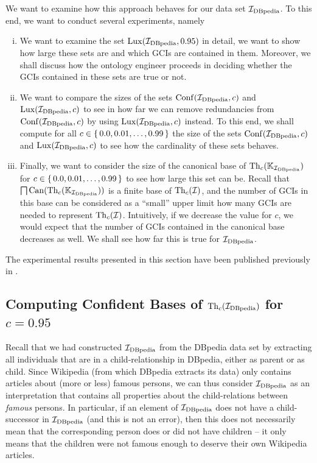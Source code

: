 We want to examine how this approach behaves for our data set ${\mathcal{I}_{\text{DBpedia}}}$.  To this end,
we want to conduct several experiments, namely
\begin{enumerate}[i. ]
\item We want to examine the set $\operatorname{Lux}({\mathcal{I}_{\text{DBpedia}}}, 0.95)$ in detail, \ie we want to show
  how large these sets are and which GCIs are contained in them.  Moreover, we shall
  discuss how the ontology engineer proceeds in deciding whether the GCIs contained in
  these sets are true or not.
\item We want to compare the sizes of the sets $\operatorname{Conf}({\mathcal{I}_{\text{DBpedia}}}, c)$ and $\operatorname{Lux}({\mathcal{I}_{\text{DBpedia}}},
  c)$ to see in how far we can remove redundancies from $\operatorname{Conf}({\mathcal{I}_{\text{DBpedia}}}, c)$ by using
  $\operatorname{Lux}({\mathcal{I}_{\text{DBpedia}}}, c)$ instead.  To this end, we shall compute for all $c \in {\ensuremath{\{\, 0.0,
    0.01, \dots, 0.99\,\}}}$ the size of the sets $\operatorname{Conf}({\mathcal{I}_{\text{DBpedia}}}, c)$ and $\operatorname{Lux}({\mathcal{I}_{\text{DBpedia}}},
  c)$ to see how the cardinality of these sets behaves.
\item Finally, we want to consider the size of the canonical base of $\operatorname{Th}_c({\mathbb{K}}_{\mathcal{I}_{\text{DBpedia}}})$ for $c \in {\ensuremath{\{\, 0.0, 0.01, \dots, 0.99 \,\}}}$ to see how large this set can
  be.  Recall that $\bigsqcap \operatorname{Can}(\operatorname{Th}_c({\mathbb{K}}_{\mathcal{I}_{\text{DBpedia}}}))$ is a finite base of
  $\operatorname{Th}_c(\mathcal{I})$, and the number of GCIs in this base can be considered as a
  ``small'' upper limit how many GCIs are needed to represent $\operatorname{Th}_c(\mathcal{I})$.
  Intuitively, if we decrease the value for $c$, we would expect that the number of GCIs
  contained in the canonical base decreases as well.  We shall see how far this is true
  for ${\mathcal{I}_{\text{DBpedia}}}$.
\end{enumerate}

The experimental results presented in this section have been published previously in
\cite{Borchmann-LTCS-12-06}.

\subsection{Computing Confident Bases of $\operatorname{Th}_c({\mathcal{I}_{\text{DBpedia}}})$ for $c = 0.95$}
\label{sec:comp-conf-bases}

Recall that we had constructed ${\mathcal{I}_{\text{DBpedia}}}$ from the DBpedia data set by extracting all
individuals that are in a \textsf{child}-relationship in DBpedia, either as parent or as
child.  Since Wikipedia (from which DBpedia extracts its data) only contains articles
about (more or less) famous persons, we can thus consider ${\mathcal{I}_{\text{DBpedia}}}$ as an interpretation
that contains all properties about the child-relations between \emph{famous} persons.  In
particular, if an element of ${\mathcal{I}_{\text{DBpedia}}}$ does not have a \textsf{child}-successor in
${\mathcal{I}_{\text{DBpedia}}}$ (and this is not an error), then this does not necessarily mean that the
corresponding person does or did not have children -- it only means that the children were
not famous enough to deserve their own Wikipedia articles.


